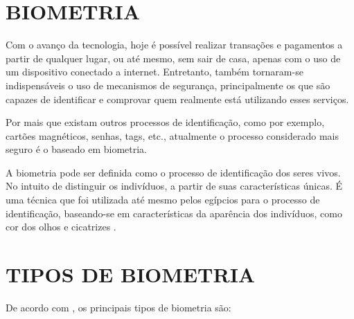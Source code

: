 \section{BIOMETRIA}\label{sec:biometria}

Com o avanço da tecnologia, hoje é possível realizar transações e pagamentos a 
partir de qualquer lugar, ou até mesmo, sem sair de casa, apenas com o uso de 
um dispositivo conectado a internet. Entretanto, também tornaram-se indispensáveis 
o uso de mecanismos de segurança, principalmente os que são capazes de identificar 
e comprovar quem realmente está utilizando esses serviços.

Por mais que existam outros processos de identificação, como por exemplo, cartões 
magnéticos, senhas, tags, etc., atualmente o processo considerado mais seguro é 
o baseado em biometria.

A biometria pode ser definida como o processo de identificação 
dos seres vivos. No intuito de distinguir os indivíduos, a partir de suas 
características únicas. É uma técnica que foi utilizada até mesmo pelos egípcios 
para o processo de identificação, baseando-se em características da
aparência dos indivíduos, como cor dos olhos e cicatrizes \cite{santos2007}.

\section{TIPOS DE BIOMETRIA}\label{sec:tiposBiometria}

De acordo com , os principais tipos de biometria são:

